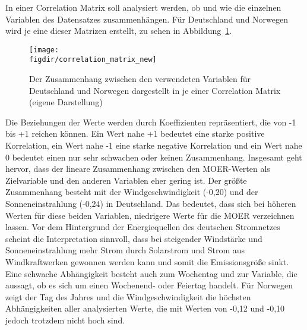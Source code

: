 In einer Correlation Matrix soll analysiert werden, ob und wie die einzelnen Variablen des Datensatzes zusammenhängen.
Für Deutschland und Norwegen wird je eine dieser Matrizen erstellt, zu sehen in Abbildung~\ref{FIG:correlation_matrix}.
\begin{figure}
 \caption[Correlation Matrix der Eingabevariablen für die Prognose]{Der Zusammenhang zwischen den verwendeten Variablen für Deutschland und Norwegen dargestellt in je einer Correlation Matrix (eigene Darstellung)}
 {\texttt{[image: \\figdir/correlation\_matrix\_new]}}
 \label{FIG:correlation_matrix}
\end{figure}
Die Beziehungen der Werte werden durch Koeffizienten repräsentiert, die von -1 bis +1 reichen können.
Ein Wert nahe +1 bedeutet eine starke positive Korrelation, ein Wert nahe -1 eine starke negative Korrelation und ein Wert nahe 0 bedeutet einen nur sehr schwachen oder keinen Zusammenhang.
Insgesamt geht hervor, dass der lineare Zusammenhang zwischen den \ac{MOER}-Werten als Zielvariable und den anderen Variablen eher gering ist.
Der größte Zusammenhang besteht mit der Windgeschwindigkeit (-0,20) und der Sonneneinstrahlung (-0,24) in Deutschland.
Das bedeutet, dass sich bei höheren Werten für diese beiden Variablen, niedrigere Werte für die \ac{MOER} verzeichnen lassen.
Vor dem Hintergrund der Energiequellen des deutschen Stromnetzes scheint die Interpretation sinnvoll, dass bei steigender Windstärke und Sonneneinstrahlung mehr Strom durch Solarstrom und Strom aus Windkraftwerken gewonnen werden kann und somit die Emissionsgröße sinkt.
Eine schwache Abhängigkeit besteht auch zum Wochentag und zur Variable, die aussagt, ob es sich um einen Wochenend- oder Feiertag handelt.
Für Norwegen zeigt der Tag des Jahres und die Windgeschwindigkeit die höchsten Abhängigkeiten aller analysierten Werte, die mit Werten von -0,12 und -0,10 jedoch trotzdem nicht hoch sind.


